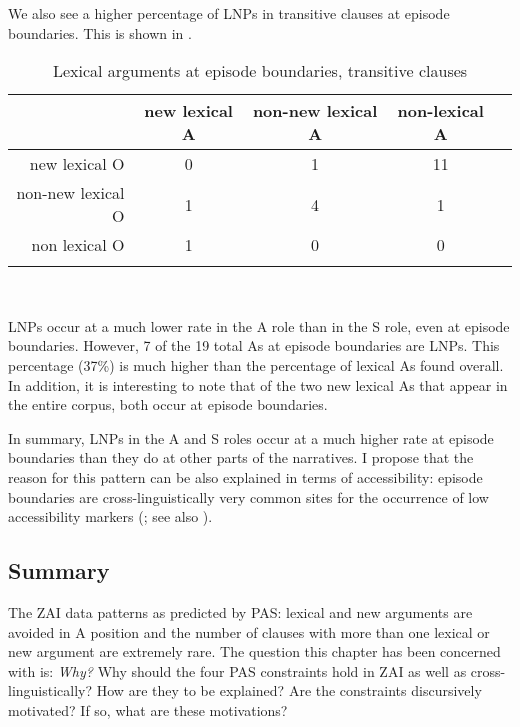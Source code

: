 We also see a higher percentage of LNPs in transitive clauses at episode boundaries. This is shown in .
\begin{table}

\caption{{Lexical arguments at episode boundaries, transitive clauses}}
\begin{tabular}{| r  c  c  c  c }
\lsptoprule
 & new lexical A & non-new lexical A & non-lexical A \\

\midrule
new lexical O & 0 & 1 & 11 \\

\midrule
non-new lexical O & 1 & 4  & 1  \\

\midrule
non lexical O & 1 &  0 & 0  \\

\lspbottomrule
\end{tabular}\\
\label{episodetr}

\end{table}
LNPs occur at a much lower rate in the A role than in the S role, even at episode boundaries. However, 7 of the 19 total As at episode boundaries are LNPs. This percentage (37{\%}) is much higher than the percentage of lexical As found overall. In addition, it is interesting to note that of the two new lexical As that appear in the entire corpus, both occur at episode boundaries. 

In summary, LNPs in the A and S roles occur at a much higher rate at episode boundaries than they do at other parts of the narratives. I propose that the reason for this pattern can be also explained in terms of accessibility: episode boundaries are cross-linguistically very common sites for the occurrence of low accessibility markers (\citealt[52]{ariel2001}; see also \citealt{downing1980}).


\subsection{Summary}\label{discussion}

The ZAI data patterns as predicted by PAS: lexical and new arguments are avoided in A position and the number of clauses with more than one lexical or new argument are extremely rare. The question this chapter has been concerned with is: \textit{Why?} Why should the four PAS constraints hold in ZAI as well as cross-linguistically? How are they to be explained? Are the constraints discursively motivated? If so, what are these motivations? 


